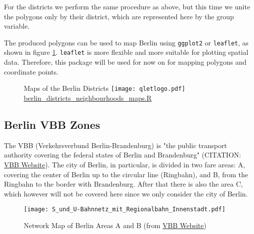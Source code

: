 For the districts we perform the same procedure as above, but this time we unite the polygons only by their district, which are represented here by the group variable.



The produced polygons can be used to map Berlin using \texttt{ggplot2} or \texttt{leaflet}, as shown in figure \ref{figure:berlin_map}. \texttt{leaflet} is more flexible and more suitable for plotting spatial data. Therefore, this package will be used for now on for mapping polygons and coordinate points.


\begin{figure}[H]
\centering
{}
\caption{Maps of the Berlin Districts \protect\texttt{[image: qletlogo.pdf]} {\href{https://github.com/silvia-ventoruzzo/SPL-WISE-2018/blob/master/Berlin_Districts_Neighbourhoods/berlin_districts_neighbourhoods_maps.R}{berlin\_districts\_neighbourhoods\_maps.R}}}
\centering
\label{figure:berlin_map}
\end{figure}

\subsection{Berlin VBB Zones}\label{subsec:vbb}

The VBB (Verkehrsverbund Berlin-Brandenburg) is "the public transport authority covering the federal states of Berlin and Brandenburg" (CITATION: \href{https://www.vbb.de/en/about-us/the-company-vbb}{VBB Website}). The city of Berlin, in particular, is divided in two fare areas: A, covering the center of Berlin up to the circular line (Ringbahn), and B, from the Ringbahn to the border with Brandenburg. After that there is also the area C, which however will not be covered here since we only consider the city of Berlin.

\begin{figure}[H]
\begin{center}
\texttt{[image: S\_und\_U-Bahnnetz\_mit\_Regionalbahn\_Innenstadt.pdf]} \\
\caption{Network Map of Berlin Areas A and B (from \href{https://www.vbb.de/en/timetables/network-maps}{VBB Website})}
\end{center}
\end{figure}

